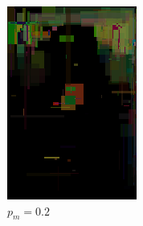 \begin{figure}[!htb]
    \centering
    \begin{subfigure}[b]{0.3\textwidth}
        \centering
        \label{fig:mutation_0_2}
         \includegraphics[width=\textwidth]{images/mona/1000_300_2/mutation/0_2.png}
         \caption{$p_{m} = 0.2$}
    \end{subfigure}
    \begin{subfigure}[b]{0.3\textwidth}
        \centering
        \label{fig:mutation_0_4}

\end{subfigure}
\end{figure}
